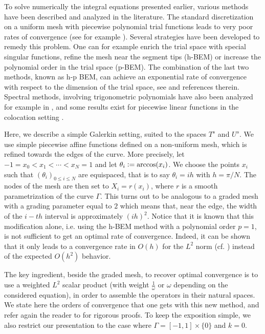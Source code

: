 \documentclass[a4paper]{article}
\begin{document}
\label{subsec:GalerkinSetting}
To solve numerically the integral equations presented earlier, various methods have been described and analyzed in the literature. 
The standard discretization on a uniform mesh with piecewise polynomial trial functions leads to very poor rates of convergence (see 
for example \cite[Chap. 4]{sauter2011boundary}). Several strategies have been developed to remedy this problem. One can for example 
enrich the trial space with special singular functions, refine the mesh near the segment tips (h-BEM) or increase the polynomial order 
in the trial space (p-BEM). The combination of the last two methods, known as h-p BEM, can achieve an exponential rate of convergence 
with respect to the dimension of the trial space, see \cite{postell1990h} and references therein. Spectral methods, involving trigonometric 
polynomials have also been analyzed for example in \cite{bruno2012second}, and some results exist for piecewise linear functions in the 
colocation setting \cite{costabel1988convergence}. 

Here, we describe a simple Galerkin setting, suited to the spaces $T^s$ and $U^s$. We use simple piecewise affine functions defined on 
a non-uniform mesh, which is refined towards the edges of the curve. More precisely, let
$-1 = x_0 < x_1 < \cdots < x_N = 1$ and let $\theta_i \mathrel{\mathop:}= \arccos(x_i)$. We choose the points $x_i$ such that $(\theta_i)_{0\leq i\leq N}$ 
are equispaced, that is to say $\theta_i = ih$ with $h = \pi/N$. The nodes of the mesh are then set to $X_i = r(x_i)$, where $r$ is a smooth 
parametrization of the curve $\Gamma$. This turns out to be analogous to a graded mesh with a grading parameter equal to $2$ which 
means that, near the edge, the width of the $i-th$ interval is approximately $(ih)^2$. Notice that it is known 
that this modification alone, i.e. using the h-BEM method with a polynomial order $p=1$, is not sufficient to get an optimal rate of convergence.
Indeed, it can be shown that it only leads to a convergence rate in $O(h)$ for the $L^2$ norm 
(cf. \cite[Theorem 1.3]{postell1990h}) instead of the expected $O(h^2)$ behavior. 

The key ingredient, beside the graded mesh, to recover optimal convergence is to use a weighted $L^2$ scalar product 
(with weight  $\frac{1}{\omega}$ or $\omega$ depending on the considered equation), in order to assemble the operators in their natural spaces. 
We state here the orders of convergence that one gets with this new method, and refer again the reader to \cite{averseng} for rigorous proofs. To 
keep the exposition simple, we also restrict our presentation to the case where $\Gamma = [-1,1]\times\{0\}$ and $k = 0$. 
\end{document}
